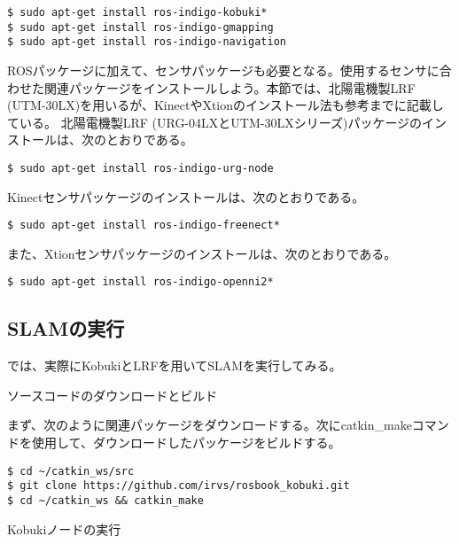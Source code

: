\begin{lstlisting}[language=ROS]
$ sudo apt-get install ros-indigo-kobuki*
$ sudo apt-get install ros-indigo-gmapping
$ sudo apt-get install ros-indigo-navigation
\end{lstlisting}

ROSパッケージに加えて、センサパッケージも必要となる。使用するセンサに合わせた関連パッケージをインストールしよう。本節では、北陽電機製LRF (UTM-30LX)を用いるが、KinectやXtionのインストール法も参考までに記載している。
北陽電機製LRF (URG-04LXとUTM-30LXシリーズ)パッケージのインストールは、次のとおりである。

\begin{lstlisting}[language=ROS]
$ sudo apt-get install ros-indigo-urg-node
\end{lstlisting}

Kinectセンサパッケージのインストールは、次のとおりである。

\begin{lstlisting}[language=ROS]
$ sudo apt-get install ros-indigo-freenect*
\end{lstlisting}

また、Xtionセンサパッケージのインストールは、次のとおりである。

\begin{lstlisting}[language=ROS]
$ sudo apt-get install ros-indigo-openni2*
\end{lstlisting}

\subsection{SLAMの実行}

では、実際にKobukiとLRFを用いてSLAMを実行してみる。

\setcounter{num}{0}

\circled{\thenum} ソースコードのダウンロードとビルド

まず、次のように関連パッケージをダウンロードする。次にcatkin\_makeコマンドを使用して、ダウンロードしたパッケージをビルドする。

\begin{lstlisting}[language=ROS]
$ cd ~/catkin_ws/src
$ git clone https://github.com/irvs/rosbook_kobuki.git
$ cd ~/catkin_ws && catkin_make
\end{lstlisting}

\circled{\thenum} Kobukiノードの実行

